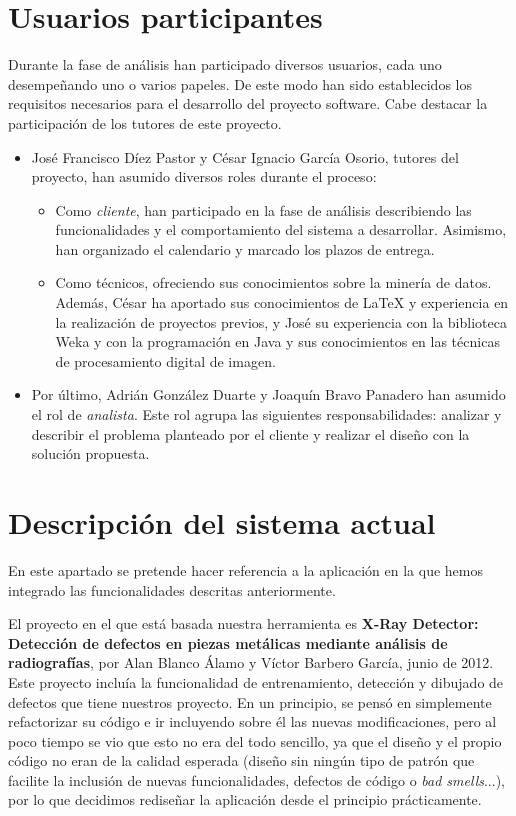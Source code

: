 \section{Usuarios participantes}
Durante la fase de análisis han participado diversos usuarios, cada uno desempeñando uno o varios papeles. De este modo han sido establecidos los requisitos necesarios para el desarrollo del proyecto software. Cabe destacar la participación de los tutores de este proyecto.
\begin{itemize}
 \item José Francisco Díez Pastor y César Ignacio García Osorio, tutores del proyecto, han asumido diversos roles durante el proceso:
 \begin{itemize}
  \item Como \textit{cliente}, han participado en la fase de análisis describiendo las funcionalidades y el comportamiento del sistema a desarrollar. Asimismo, han organizado el calendario y marcado los plazos de entrega.
  \item Como técnicos, ofreciendo sus conocimientos sobre la minería de datos. Además, César ha aportado sus conocimientos de LaTeX y experiencia en la realización de proyectos previos, y José su experiencia con la biblioteca Weka y con la programación en Java y sus conocimientos en las técnicas de procesamiento digital de imagen.
 \end{itemize}
 \item Por último, Adrián González Duarte y Joaquín Bravo Panadero han asumido el rol de \textit{analista}. Este rol agrupa las siguientes responsabilidades: analizar y describir el problema planteado por el cliente y realizar el diseño con la solución propuesta.
\end{itemize}
\newpage

\section{Descripción del sistema actual}
En este apartado se pretende hacer referencia a la aplicación en la que hemos integrado las funcionalidades descritas anteriormente.

El proyecto en el que está basada nuestra herramienta es \textbf{X-Ray Detector: Detección de defectos en piezas metálicas mediante análisis de radiografías}, por Alan Blanco Álamo y Víctor Barbero García, junio de 2012. Este proyecto incluía la funcionalidad de entrenamiento, detección y dibujado de defectos que tiene nuestros proyecto. En un principio, se pensó en simplemente refactorizar su código e ir incluyendo sobre él las nuevas modificaciones, pero al poco tiempo se vio que esto no era del todo sencillo, ya que el diseño y el propio código no eran de la calidad esperada (diseño sin ningún tipo de patrón que facilite la inclusión de nuevas funcionalidades, defectos de código o \textit{bad smells}...), por lo que decidimos rediseñar la aplicación desde el principio prácticamente.

